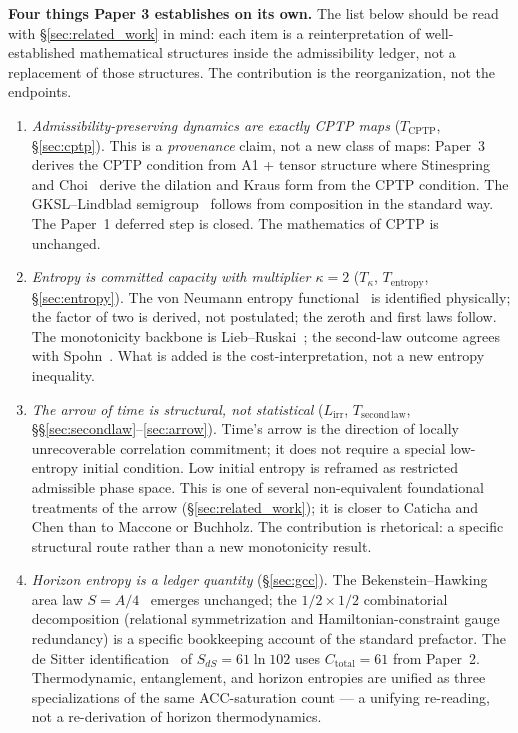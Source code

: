 \documentclass[11pt]{article}
\begin{document}
\smallskip\noindent\textbf{Four things Paper 3 establishes on its own.}
The list below should be read with \S\ref{sec:related_work} in mind: each
item is a reinterpretation of well-established mathematical structures
inside the admissibility ledger, not a replacement of those structures.
The contribution is the reorganization, not the endpoints.
\begin{enumerate}[nosep]
  \item \emph{Admissibility-preserving dynamics are exactly CPTP maps}
    ($T_{\mathrm{CPTP}}$, \S\ref{sec:cptp}).  This is a \emph{provenance}
    claim, not a new class of maps: Paper~3 derives the CPTP condition
    from A1 + tensor structure where Stinespring~\cite{Stinespring1955}
    and Choi~\cite{Choi1975} derive the dilation and Kraus form from the
    CPTP condition.  The GKSL--Lindblad semigroup~\cite{Lindblad1976,GKS1976}
    follows from composition in the standard way.  The Paper~1 deferred
    step is closed.  The mathematics of CPTP is unchanged.
  \item \emph{Entropy is committed capacity with multiplier
    $\kappa = 2$} ($T_{\kappa}$, $T_{\mathrm{entropy}}$,
    \S\ref{sec:entropy}).  The von Neumann entropy
    functional~\cite{vonNeumann1932} is identified physically; the factor
    of two is derived, not postulated; the zeroth and first laws follow.
    The monotonicity backbone is Lieb--Ruskai~\cite{LiebRuskai1973}; the
    second-law outcome agrees with Spohn~\cite{Spohn1978}.  What is added
    is the cost-interpretation, not a new entropy inequality.
  \item \emph{The arrow of time is structural, not statistical}
    ($L_{\mathrm{irr}}$, $T_{\mathrm{second\,law}}$, \S\S\ref{sec:secondlaw}--\ref{sec:arrow}).
    Time's arrow is the direction of locally unrecoverable correlation
    commitment; it does not require a special low-entropy initial condition.
    Low initial entropy is reframed as restricted admissible phase space.
    This is one of several non-equivalent foundational treatments of the
    arrow (\S\ref{sec:related_work}); it is closer to Caticha and Chen
    than to Maccone or Buchholz.  The contribution is rhetorical: a
    specific structural route rather than a new monotonicity result.
  \item \emph{Horizon entropy is a ledger quantity}
    (\S\ref{sec:gcc}).  The Bekenstein--Hawking area law $S =
    A/4$~\cite{Bekenstein1973,Hawking1975} emerges unchanged; the
    $1/2 \times 1/2$ combinatorial decomposition (relational symmetrization
    and Hamiltonian-constraint gauge redundancy) is a specific bookkeeping
    account of the standard prefactor.  The de Sitter
    identification~\cite{GibbonsHawking1977} of $S_{dS} = 61 \ln 102$ uses
    $C_{\mathrm{total}} = 61$ from Paper~2.  Thermodynamic,
    entanglement, and horizon entropies are unified as three specializations
    of the same ACC-saturation count --- a unifying re-reading, not a
    re-derivation of horizon thermodynamics.
\end{enumerate}
\end{document}
